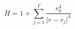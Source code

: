 \begin{equation}
H=1+\sum_{j=1}^{\Gamma }\frac{r_0^4}{\vert r-r_j\vert^4}
\label{H}
\end{equation}

